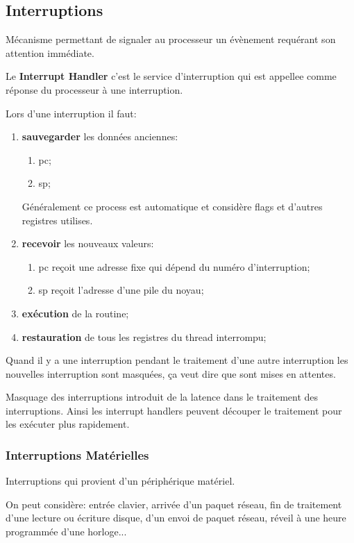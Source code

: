 \documentclass{article}
\begin{document}
\subsection{Interruptions}
\begin{definition}
    Mécanisme permettant de signaler au processeur un évènement requérant son attention immédiate.

    \begin{remark}
        Le \textbf{Interrupt Handler} c'est le service d'interruption qui est appellee comme réponse du processeur à une interruption.
    \end{remark}
    Lors d'une interruption il faut:
    \begin{enumerate}[]
        \item \textbf{sauvegarder} les données anciennes:
        \begin{enumerate}[noitemsep]
            \item pc;
            \item sp;
        \end{enumerate}
        Généralement ce process est automatique et considère flags et d'autres registres utilises.

        \item \textbf{recevoir} les nouveaux valeurs:
        \begin{enumerate}[noitemsep]
            \item pc reçoit une adresse fixe qui dépend du numéro d'interruption;
            \item sp reçoit l'adresse d'une pile du noyau; 
        \end{enumerate}

        \item \textbf{exécution} de la routine;
        \item \textbf{restauration} de tous les registres du thread interrompu;
    \end{enumerate}
    Quand il y a une interruption pendant le traitement d'une autre interruption les nouvelles interruption sont masquées, ça veut dire que sont mises en attentes.
    \begin{remark}
        Masquage des interruptions introduit de la latence dans le traitement des interruptions. Ainsi les interrupt handlers peuvent découper le traitement pour les exécuter plus rapidement.
    \end{remark}
\end{definition}

\subsubsection{Interruptions Matérielles}
\begin{definition}
    Interruptions qui provient d'un périphérique matériel.

    \begin{example}
        On peut considère: entrée clavier, arrivée d'un paquet réseau, fin de traitement d'une lecture ou écriture disque, d'un envoi de paquet réseau, réveil à une heure programmée d'une horloge...
    \end{example}
\end{definition}
\end{document}
